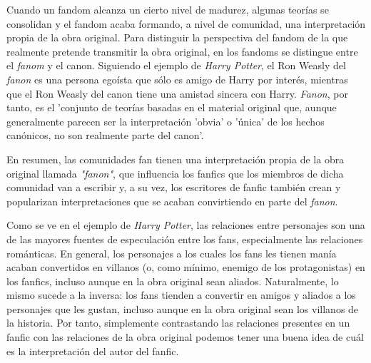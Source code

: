 \documentclass{pre-tfg}
\begin{document}
Cuando un fandom alcanza un cierto nivel de madurez, algunas teorías se consolidan y el fandom acaba formando, a nivel de comunidad, una interpretación propia de la obra original. Para distinguir la perspectiva del fandom de la que realmente pretende transmitir la obra original, en los fandoms se distingue entre el \textit{fanom} y el canon. Siguiendo el ejemplo de \textit{Harry Potter}, el Ron Weasly del \textit{fanon} es una persona egoísta que sólo es amigo de Harry por interés, mientras que el Ron Weasly del canon tiene una amistad sincera con Harry. \textit{Fanon}, por tanto, es el 'conjunto de teorías basadas en el material original que, aunque generalmente parecen ser la interpretación 'obvia' o 'única' de los hechos canónicos, no son realmente parte del canon'\cite{uncanny_2017}.



En resumen, las comunidades fan tienen una interpretación propia de la obra original llamada \textit{"fanon"}, que influencia los fanfics que los miembros de dicha comunidad van a escribir y, a su vez, los escritores de fanfic también crean y popularizan interpretaciones que se acaban convirtiendo en parte del \textit{fanon}.

Como se ve en el ejemplo de \textit{Harry Potter}, las relaciones entre personajes son una de las mayores fuentes de especulación entre los fans, especialmente las relaciones románticas. En general, los personajes a los cuales los fans les tienen manía acaban convertidos en villanos (o, como mínimo, enemigo de los protagonistas) en los fanfics, incluso aunque en la obra original sean aliados. Naturalmente, lo mismo sucede a la inversa: los fans tienden a convertir en amigos y aliados a los personajes que les gustan, incluso aunque en la obra original sean los villanos de la historia. Por tanto, simplemente contrastando las relaciones presentes en un fanfic con las relaciones de la obra original podemos tener una buena idea de cuál es la interpretación del autor del fanfic.
\end{document}
